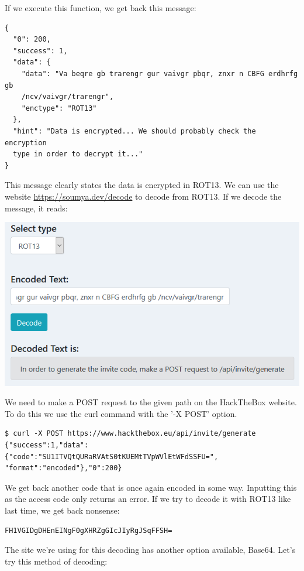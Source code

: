 \documentclass[../main.tex]{subfiles}
\begin{document}
\newpage
If we execute this function, we get back this message:

\begin{lstlisting}
{
  "0": 200,
  "success": 1,
  "data": {
    "data": "Va beqre gb trarengr gur vaivgr pbqr, znxr n CBFG erdhrfg gb
    /ncv/vaivgr/trarengr",
    "enctype": "ROT13"
  },
  "hint": "Data is encrypted... We should probably check the encryption 
  type in order to decrypt it..."
}
\end{lstlisting}

This message clearly states the data is encrypted in ROT13. We can use the website \url{https://soumya.dev/decode} to decode from ROT13. If we decode the message, it reads:

\begin{center}
    \includegraphics[width=0.75\linewidth]{images/hackthebox_decode.png}
\end{center}

We need to make a POST request to the given path on the HackTheBox website. To do this we use the curl command with the '-X POST' option.

\begin{lstlisting}
$ curl -X POST https://www.hackthebox.eu/api/invite/generate
{"success":1,"data":{"code":"SU1ITVQtQURaRVAtS0tKUEMtTVpWVlEtWFdSSFU=",
"format":"encoded"},"0":200}
\end{lstlisting}

We get back another code that is once again encoded in some way. Inputting this as the access code only returns an error. If we try to decode it with ROT13 like last time, we get back nonsense:

\begin{lstlisting}
FH1VGIDgDHEnEINgF0gXHRZgGIcJIyRgJSqFFSH=
\end{lstlisting}

The site we're using for this decoding has another option available, Base64. Let's try this method of decoding:
\end{document}
